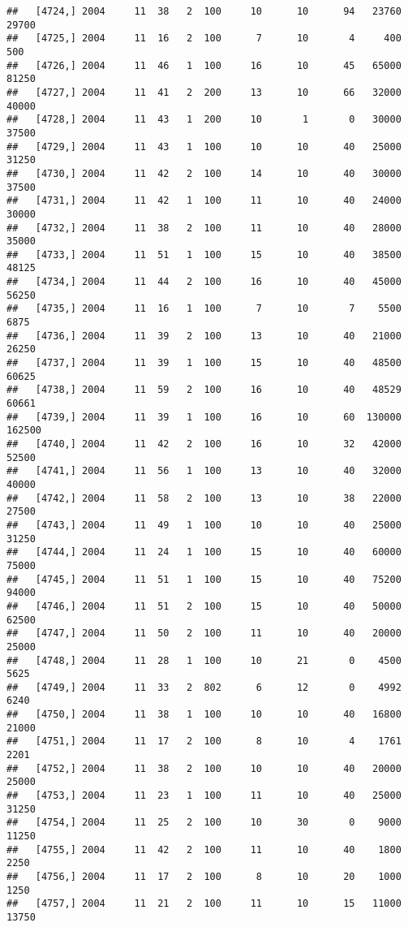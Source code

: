\documentclass{article}\usepackage[]{graphicx}\usepackage[]{color}
\makeatletter
\newenvironment{kframe}{%
 \def\at@end@of@kframe{}%
 \ifinner\ifhmode%
  \def\at@end@of@kframe{\end{minipage}}%
  \begin{minipage}{\columnwidth}%
 \fi\fi%
 \def\FrameCommand##1{\hskip\@totalleftmargin \hskip-\fboxsep
 \colorbox{shadecolor}{##1}\hskip-\fboxsep
     \hskip-\linewidth \hskip-\@totalleftmargin \hskip\columnwidth}%
 \MakeFramed {\advance\hsize-\width
   \@totalleftmargin\z@ \linewidth\hsize
   \@setminipage}}%
 {\par\unskip\endMakeFramed%
 \at@end@of@kframe}
\newenvironment{knitrout}{}{} %
\makeatother
\begin{document}
\begin{knitrout}
\begin{kframe}
\begin{verbatim}
##   [4724,] 2004     11  38   2  100     10      10      94   23760   29700
##   [4725,] 2004     11  16   2  100      7      10       4     400     500
##   [4726,] 2004     11  46   1  100     16      10      45   65000   81250
##   [4727,] 2004     11  41   2  200     13      10      66   32000   40000
##   [4728,] 2004     11  43   1  200     10       1       0   30000   37500
##   [4729,] 2004     11  43   1  100     10      10      40   25000   31250
##   [4730,] 2004     11  42   2  100     14      10      40   30000   37500
##   [4731,] 2004     11  42   1  100     11      10      40   24000   30000
##   [4732,] 2004     11  38   2  100     11      10      40   28000   35000
##   [4733,] 2004     11  51   1  100     15      10      40   38500   48125
##   [4734,] 2004     11  44   2  100     16      10      40   45000   56250
##   [4735,] 2004     11  16   1  100      7      10       7    5500    6875
##   [4736,] 2004     11  39   2  100     13      10      40   21000   26250
##   [4737,] 2004     11  39   1  100     15      10      40   48500   60625
##   [4738,] 2004     11  59   2  100     16      10      40   48529   60661
##   [4739,] 2004     11  39   1  100     16      10      60  130000  162500
##   [4740,] 2004     11  42   2  100     16      10      32   42000   52500
##   [4741,] 2004     11  56   1  100     13      10      40   32000   40000
##   [4742,] 2004     11  58   2  100     13      10      38   22000   27500
##   [4743,] 2004     11  49   1  100     10      10      40   25000   31250
##   [4744,] 2004     11  24   1  100     15      10      40   60000   75000
##   [4745,] 2004     11  51   1  100     15      10      40   75200   94000
##   [4746,] 2004     11  51   2  100     15      10      40   50000   62500
##   [4747,] 2004     11  50   2  100     11      10      40   20000   25000
##   [4748,] 2004     11  28   1  100     10      21       0    4500    5625
##   [4749,] 2004     11  33   2  802      6      12       0    4992    6240
##   [4750,] 2004     11  38   1  100     10      10      40   16800   21000
##   [4751,] 2004     11  17   2  100      8      10       4    1761    2201
##   [4752,] 2004     11  38   2  100     10      10      40   20000   25000
##   [4753,] 2004     11  23   1  100     11      10      40   25000   31250
##   [4754,] 2004     11  25   2  100     10      30       0    9000   11250
##   [4755,] 2004     11  42   2  100     11      10      40    1800    2250
##   [4756,] 2004     11  17   2  100      8      10      20    1000    1250
##   [4757,] 2004     11  21   2  100     11      10      15   11000   13750

\end{verbatim}
\end{kframe}
\end{knitrout}
\end{document}
